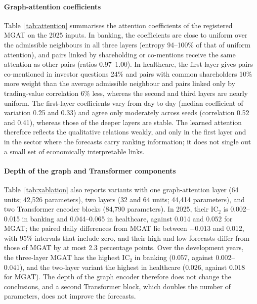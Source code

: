 {\paragraph{Graph-attention coefficients}
Table~\ref{tab:attention} summarises the attention coefficients of the registered MGAT on the 2025 inputs. In banking, the coefficients are close to uniform over the admissible neighbours in all three layers (entropy 94--100\% of that of uniform attention), and pairs linked by shareholding or co-mentions receive the same attention as other pairs (ratios 0.97--1.00). In healthcare, the first layer gives pairs co-mentioned in investor questions 24\% and pairs with common shareholders 10\% more weight than the average admissible neighbour and pairs linked only by trading-value correlation 6\% less, whereas the second and third layers are nearly uniform. The first-layer coefficients vary from day to day (median coefficient of variation 0.25 and 0.33) and agree only moderately across seeds (correlation 0.52 and 0.41), whereas those of the deeper layers are stable. The learned attention therefore reflects the qualitative relations weakly, and only in the first layer and in the sector where the forecasts carry ranking information; it does not single out a small set of economically interpretable links.

\paragraph{Depth of the graph and Transformer components}
Table~\ref{tab:xablation} also reports variants with one graph-attention layer (64 units; 42{,}526 parameters), two layers (32 and 64 units; 44{,}414 parameters), and two Transformer encoder blocks (84{,}790 parameters). In 2025, their IC$_2$ is 0.002--0.015 in banking and 0.044--0.065 in healthcare, against 0.014 and 0.052 for MGAT; the paired daily differences from MGAT lie between $-0.013$ and 0.012, with 95\% intervals that include zero, and their high and low forecasts differ from those of MGAT by at most 2.3 percentage points. Over the development years, the three-layer MGAT has the highest IC$_2$ in banking (0.057, against 0.002--0.041), and the two-layer variant the highest in healthcare (0.026, against 0.018 for MGAT). The depth of the graph encoder therefore does not change the conclusions, and a second Transformer block, which doubles the number of parameters, does not improve the forecasts.

}
